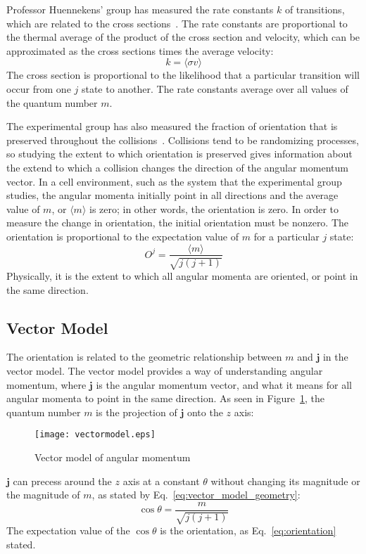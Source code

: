 \documentclass[letterpaper,11pt]{article}
\newcommand{\vectorize}[1]{\boldsymbol{#1}}
\begin{document}
Professor Huennekens' group has measured the rate constants $k$ of transitions,
which are related to the cross sections~\cite{Hue15}.  The rate
constants are proportional to the thermal average of the product of the cross
section and velocity, which can be approximated as the cross sections times the
average velocity:
\begin{equation}
    k=\langle\sigma v\rangle
\label{eq:rate_constants}
\end{equation}
The cross section is proportional to the likelihood that a particular transition
will occur from one $j$ state to another.  The rate constants average over all
values of the quantum number $m$.

The experimental group has also measured the fraction of orientation that is
preserved throughout the collisions~\cite{Hue15}.  Collisions tend
to be randomizing processes, so studying the extent to which orientation is
preserved gives information about the extend to which a collision changes the
direction of the angular momentum vector. In a cell environment, such as the system that
the experimental group studies, the angular momenta initially point in all
directions and the average value of $m$, or $\langle m\rangle$ is zero; in
other words, the orientation is zero.  In order to measure the change in
orientation, the initial orientation must be nonzero.  The orientation is
proportional to the expectation value of $m$ for a particular $j$ state:
\begin{equation}
    O^j=\frac{\langle m\rangle}{\sqrt{j(j+1)}}
    \label{eq:orientation}
\end{equation}
Physically, it is the extent to which all angular momenta are oriented, or
point in the same direction.

\subsection{Vector Model}
The orientation is  related to the geometric relationship between $m$ and $\vectorize{j}$
in the vector model.  The vector model provides a way of understanding angular
momentum, where $\vectorize{j}$ is the angular momentum vector, and what it means for all
angular momenta to point in the same direction.  As seen in
Figure~\ref{fig:vectormodel}, the quantum number $m$ is the projection of $\vectorize{j}$
onto the $z$ axis:
\begin{figure}[ht]
    \centering
    \texttt{[image: vectormodel.eps]}
    \caption{Vector model of angular momentum}
\label{fig:vectormodel}
\end{figure}
$\vectorize{j}$ can precess around the $z$ axis at a constant $\theta$ without changing its
magnitude or the magnitude of $m$, as stated by
Eq.~\ref{eq:vector_model_geometry}:
\begin{equation}
    \cos\theta=\frac{m}{\sqrt{j(j+1)}}
    \label{eq:vector_model_geometry}
\end{equation}
The expectation value of the $\cos\theta$ is the orientation, as
Eq.~\ref{eq:orientation} stated.
\end{document}
